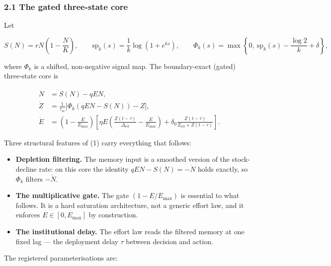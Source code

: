 \documentclass[11pt]{article}
\providecommand{\tightlist}{\setlength{\itemsep}{0pt}\setlength{\parskip}{0pt}}
\begin{document}
\subsubsection{2.1 The gated three-state
core}\label{the-gated-three-state-core}

Let

\[S(N) = rN\left(1 - \frac{N}{K}\right), \qquad \mathrm{sp}_k(s) = \frac{1}{k}\log(1 + e^{ks}), \qquad \Phi_k(s) = \max\left\{0,\ \mathrm{sp}_k(s) - \frac{\log 2}{k} + \delta\right\},\]

where \(\Phi_k\) is a shifted, non-negative signal map. The
boundary-exact (gated) three-state core is

\[\begin{aligned}
\dot N &= S(N) - qEN, \\
\dot Z &= \frac{1}{\tau_m}\bigl[\Phi_k(qEN - S(N)) - Z\bigr], \\
\dot E &= \left(1 - \frac{E}{E_{\max}}\right)\left[\eta E\left(\frac{Z(t-\tau)}{\Delta_{\mathrm{ref}}} - \frac{E}{E_{\max}}\right) + \delta_0\frac{Z(t-\tau)}{Z_{\mathrm{ref}} + Z(t-\tau)}\right].
\end{aligned} \tag{1}\]

Three structural features of (1) carry everything that follows:

\begin{itemize}
\tightlist
\item
  \textbf{Depletion filtering.} The memory input is a smoothed version
  of the stock-decline rate: on this core the identity
  \(qEN - S(N) = -\dot N\) holds exactly, so \(\Phi_k\) filters
  \(-\dot N\).
\item
  \textbf{The multiplicative gate.} The gate \((1 - E/E_{\max})\) is
  essential to what follows. It is a hard saturation architecture, not a
  generic effort law, and it enforces \(E \in [0, E_{\max}]\) by
  construction.
\item
  \textbf{The institutional delay.} The effort law reads the filtered
  memory at one fixed lag --- the deployment delay \(\tau\) between
  decision and action.
\end{itemize}

The registered parameterisations are:
\end{document}
